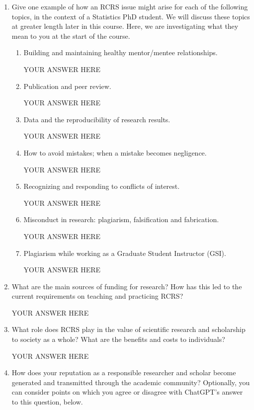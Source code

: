 \documentclass[12pt]{article}
\begin{document}
\begin{enumerate}
\item Give one example of how an RCRS issue might arise for each of the following topics, in the context of a Statistics PhD student. We will discuss these topics at greater length later in this course. Here, we are investigating what they mean to you at the start of the course.
\begin{enumerate}
\item Building and maintaining healthy mentor/mentee relationships.

YOUR ANSWER HERE

\item Publication and peer review. 

YOUR ANSWER HERE

\item Data and the reproducibility of research results.

YOUR ANSWER HERE

\item How to avoid mistakes; when a mistake becomes negligence.

YOUR ANSWER HERE

\item Recognizing and responding to conflicts of interest.

YOUR ANSWER HERE

\item Misconduct in research: plagiarism, falsification and fabrication.

YOUR ANSWER HERE

\item Plagiarism while working as a Graduate Student Instructor (GSI).

YOUR ANSWER HERE

\end{enumerate}

\item What are the main sources of funding for research? How has this led to the current requirements on teaching and practicing RCRS?

YOUR ANSWER HERE

\item What role does RCRS play in the value of scientific research and scholarship to society as a whole? What are the benefits and costs to individuals?

YOUR ANSWER HERE

\item How does your reputation as a responsible researcher and scholar become generated and transmitted through the academic community? Optionally, you can consider points on which you agree or disagree with ChatGPT's answer to this question, below.


\end{enumerate}
\end{document}
